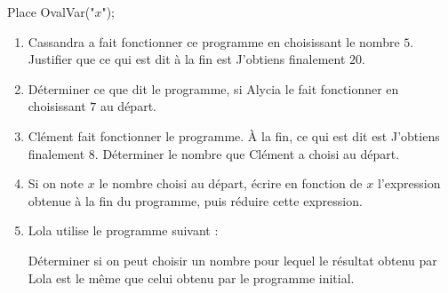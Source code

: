 \begin{exercice*}
\begin{minipage}{0.35\linewidth}
{{{        \smallskip
        \begin{Scratch}[Echelle=0.7]
            Place OvalVar("$x$");
        \end{Scratch}
        }
        }
        }
    \end{minipage}
    \begin{enumerate}
        \item Cassandra a fait fonctionner ce programme en choisissant le nombre $5$. Justifier que ce qui est dit à la fin est \og J'obtiens finalement $20$\fg{}.
        \item Déterminer ce que dit le programme, si Alycia le fait fonctionner en choisissant $7$ au départ.
        \item Clément fait fonctionner le programme. À la fin, ce qui est dit est \og J'obtiens finalement $8$\fg{}. Déterminer le nombre que Clément a choisi au départ.
        \item Si on note $x$ le nombre choisi au départ, écrire en fonction de $x$ l'expression obtenue à la fin du programme, puis réduire cette expression.
        \item Lola utilise le programme suivant :
        
        \begin{minipage}{1\linewidth}
        \end{minipage}

        \smallskip
        Déterminer si on peut choisir un nombre pour lequel le résultat obtenu par Lola est le même que celui obtenu par le programme initial.
    \end{enumerate}
\end{exercice*}
